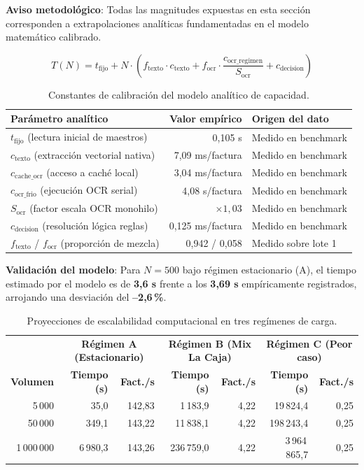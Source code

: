 \documentclass[11pt,a4paper]{article}
\begin{document}
\textbf{Aviso metodológico}: Todas las magnitudes expuestas en esta sección corresponden a extrapolaciones analíticas fundamentadas en el modelo matemático calibrado.

$$T(N) = t_{\text{fijo}} + N \cdot \left( f_{\text{texto}} \cdot c_{\text{texto}} + f_{\text{ocr}} \cdot \frac{c_{\text{ocr\_regimen}}}{S_{\text{ocr}}} + c_{\text{decision}} \right)$$

\begin{table}[htbp]
\centering
\begin{tabular}{lrl}
\toprule
\textbf{Parámetro analítico} & \textbf{Valor empírico} & \textbf{Origen del dato} \\
\midrule
$t_{\text{fijo}}$ (lectura inicial de maestros) & 0,105 s & Medido en benchmark \\
$c_{\text{texto}}$ (extracción vectorial nativa) & 7,09 ms/factura & Medido en benchmark \\
$c_{\text{cache\_ocr}}$ (acceso a caché local) & 3,04 ms/factura & Medido en benchmark \\
$c_{\text{ocr\_frio}}$ (ejecución OCR serial) & 4,08 s/factura & Medido en benchmark \\
$S_{\text{ocr}}$ (factor escala OCR monohilo) & $\times 1,03$ & Medido en benchmark \\
$c_{\text{decision}}$ (resolución lógica reglas) & 0,125 ms/factura & Medido en benchmark \\
$f_{\text{texto}}$ / $f_{\text{ocr}}$ (proporción de mezcla) & 0,942 / 0,058 & Medido sobre lote 1 \\
\bottomrule
\end{tabular}
\caption{Constantes de calibración del modelo analítico de capacidad.}
\end{table}

\textbf{Validación del modelo}: Para $N=500$ bajo régimen estacionario (A), el tiempo estimado por el modelo es de \textbf{3,6 s} frente a los \textbf{3,69 s} empíricamente registrados, arrojando una desviación del \textbf{--2,6\,\%}.

\begin{table}[htbp]
\centering
\begin{tabular}{r|rr|rr|rr}
\toprule
& \multicolumn{2}{c|}{\textbf{Régimen A (Estacionario)}} & \multicolumn{2}{c|}{\textbf{Régimen B (Mix La Caja)}} & \multicolumn{2}{c}{\textbf{Régimen C (Peor caso)}} \\
\textbf{Volumen} & \textbf{Tiempo (s)} & \textbf{Fact./s} & \textbf{Tiempo (s)} & \textbf{Fact./s} & \textbf{Tiempo (s)} & \textbf{Fact./s} \\
\midrule
5\,000     & 35,0    & 142,83 & 1\,183,9    & 4,22 & 19\,824,4      & 0,25 \\
50\,000    & 349,1   & 143,22 & 11\,838,1   & 4,22 & 198\,243,4     & 0,25 \\
1\,000\,000& 6\,980,3 & 143,26 & 236\,759,0  & 4,22 & 3\,964\,865,7  & 0,25 \\
\bottomrule
\end{tabular}
\caption{Proyecciones de escalabilidad computacional en tres regímenes de carga.}
\end{table}
\end{document}
